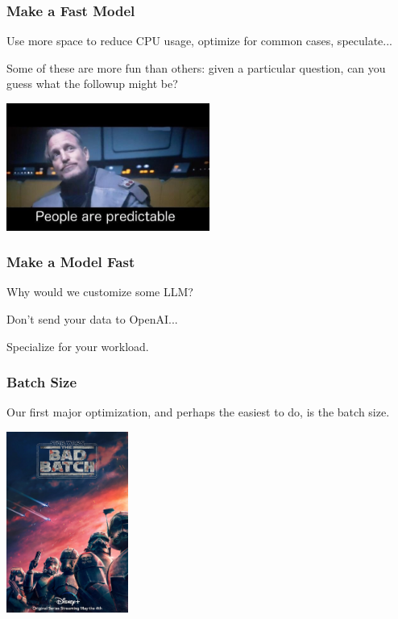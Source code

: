 \begin{frame}
\frametitle{Make a Fast Model}

Use more space to reduce CPU usage, optimize for common cases, speculate...

Some of these are more fun than others: given a particular question, can you guess what the followup might be? 

\begin{center}
	\includegraphics[width=0.5\textwidth]{images/predictable.jpg}
\end{center}

\end{frame}

\begin{frame}
\frametitle{Make a Model Fast}

Why would we customize some LLM?

Don't send your data to OpenAI...

Specialize for your workload.

\end{frame}

\begin{frame}
\frametitle{Batch Size}

Our first major optimization, and perhaps the easiest to do, is the batch size.

\begin{center}
	\includegraphics[width=0.3\textwidth]{images/badbatch.jpg}
\end{center}


\end{frame}

